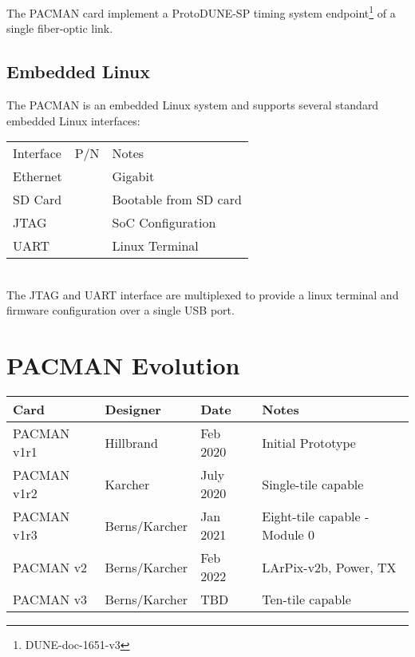\documentclass[12pt]{article}
\begin{document}
The PACMAN card implement a ProtoDUNE-SP timing system
endpoint\footnote{DUNE-doc-1651-v3} of a single fiber-optic link.

\subsection{Embedded Linux}

The PACMAN is an embedded Linux system and supports several standard embedded Linux interfaces:\\
\begin{tabular}{lll}
Interface & P/N & Notes \\ 
Ethernet & & Gigabit \\
SD Card & & Bootable from SD card\\
JTAG & & SoC Configuration\\
UART & & Linux Terminal\\
\end{tabular}\\  
The JTAG and UART interface are multiplexed to provide a linux terminal and firmware configuration over a single USB port. 

\appendix

\newpage
\section{PACMAN Evolution}

\vskip 0.5cm
\begin{center}
\begin{tabular}{llll}
Card        & Designer      & Date & Notes \\
\hline
PACMAN v1r1 & Hillbrand     & Feb 2020 & Initial Prototype \\
PACMAN v1r2 & Karcher       & July 2020 & Single-tile capable\\
PACMAN v1r3 & Berns/Karcher & Jan 2021 & Eight-tile capable - Module 0\\
PACMAN v2 & Berns/Karcher   & Feb 2022 & LArPix-v2b, Power, TX\\
PACMAN v3 & Berns/Karcher   & TBD & Ten-tile capable \\
\end{tabular}
\end{center}
\end{document}
